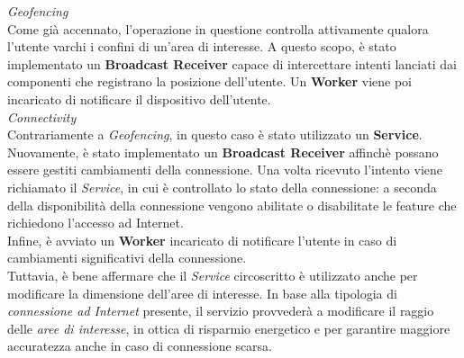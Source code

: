 \documentclass{article}
\begin{document}
\textit{Geofencing} \\
Come già accennato, l'operazione in questione controlla attivamente qualora l'utente varchi i confini di un'area di interesse. A questo scopo, è stato implementato un \textbf{Broadcast Receiver} capace di intercettare intenti lanciati dai componenti che registrano la posizione dell'utente. Un \textbf{Worker} viene poi incaricato di notificare il dispositivo dell'utente.\vspace*{7pt}\\
\textit{Connectivity} \\
Contrariamente a \textit{Geofencing}, in questo caso è stato utilizzato un \textbf{Service}. Nuovamente, è stato implementato un \textbf{Broadcast Receiver} affinchè possano essere gestiti cambiamenti della connessione. Una volta ricevuto l'intento viene richiamato il \textit{Service}, in cui è controllato lo stato della connessione: a seconda della disponibilità della connessione vengono abilitate o disabilitate le feature che richiedono l'accesso ad Internet.\\
Infine, è avviato un \textbf{Worker} incaricato di notificare l'utente in caso di cambiamenti significativi della connessione. \vspace*{7pt}\\
Tuttavia, è bene affermare che il \textit{Service} circoscritto è utilizzato anche per modificare la dimensione dell'aree di interesse. In base alla tipologia di \textit{connessione ad Internet} presente, il servizio provvederà a modificare il raggio delle \textit{aree di interesse}, in ottica di risparmio energetico e per garantire maggiore accuratezza anche in caso di connessione scarsa.
\end{document}
